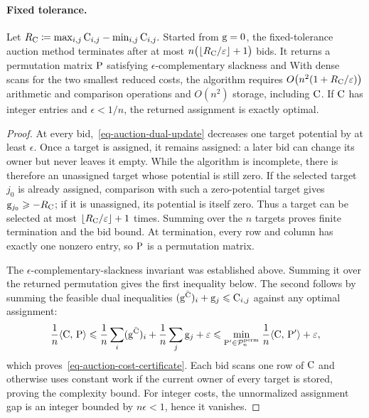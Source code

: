 \paragraph{Fixed tolerance.}
\begin{prop}\label{prop-auction-termination}
Let
\(R_\C\eqdef\max_{i,j}\C_{i,j}-\min_{i,j}\C_{i,j}.\)
Started from $\gD=0$, the fixed-tolerance auction method terminates after at most
\(
n\bigl(\lfloor R_\C/\epsilon\rfloor+1\bigr)
\)
bids. It returns a permutation matrix $\P$ satisfying $\epsilon$-complementary slackness and
With dense scans for the two smallest reduced costs, the algorithm requires
\(
O\bigl(n^2(1+R_\C/\epsilon)\bigr)
\)
arithmetic and comparison operations and $O(n^2)$ storage, including $\C$. If $\C$ has integer entries and $\epsilon<1/n$, the returned assignment is exactly optimal.
\end{prop}
\begin{proof}
At every bid,~\eqref{eq-auction-dual-update} decreases one target potential by at least $\epsilon$. Once a target is assigned, it remains assigned: a later bid can change its owner but never leaves it empty. While the algorithm is incomplete, there is therefore an unassigned target whose potential is still zero. If the selected target $j_0$ is already assigned, comparison with such a zero-potential target gives $\gD_{j_0}\geq-R_\C$; if it is unassigned, its potential is itself zero. Thus a target can be selected at most $\lfloor R_\C/\epsilon\rfloor+1$ times. Summing over the $n$ targets proves finite termination and the bid bound. At termination, every row and column has exactly one nonzero entry, so $\P$ is a permutation matrix.

The $\epsilon$-complementary-slackness invariant was established above. Summing it over the returned permutation gives the first inequality below. The second follows by summing the feasible dual inequalities $(\gD^{\bar\C})_i+\gD_j\leq\C_{i,j}$ against any optimal assignment:
\[
\frac1n\dotp{\C}{\P}
\leq
\frac1n\sum_i(\gD^{\bar\C})_i
+
\frac1n\sum_j\gD_j
+
\epsilon
\leq
\umin{\P'\in\mathcal P_n^{\mathrm{perm}}}
\frac1n\dotp{\C}{\P'}
+
\epsilon,
\]
which proves~\eqref{eq-auction-cost-certificate}. Each bid scans one row of $\C$ and otherwise uses constant work if the current owner of every target is stored, proving the complexity bound. For integer costs, the unnormalized assignment gap is an integer bounded by $n\epsilon<1$, hence it vanishes.
\end{proof}
